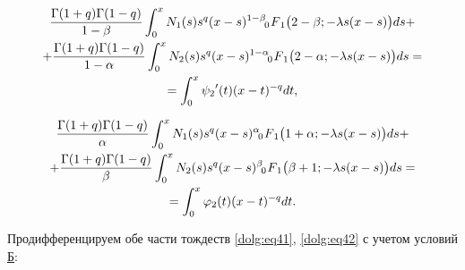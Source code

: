\begin{multline}

\label{dolg:eq41}

\frac{\Gamma(1+q)\Gamma(1-q)}{1-\beta} \int _0^x N_1(s) s^{q} (x-s)^{1-\beta}  \,\,

F_{\hspace{-4mm}0 \hspace{3mm}1} \bigl(2-\beta;-\lambda s (x-s)\bigr) ds +

\\

+\frac{\Gamma(1+q)\Gamma(1-q)}{1-\alpha} \int _0^x N_2(s) s^{q} (x-s)^{1-\alpha}  \,\,

F_{\hspace{-4mm}0 \hspace{3mm}1} \bigl(2-\alpha;-\lambda s (x-s)\bigr) ds =

\\

 = \int _0^x {\psi_2}'(t) (x-t)^{-q} dt,

\end{multline}

\begin{multline}

\label{dolg:eq42}

\frac{\Gamma(1+q)\Gamma(1-q)}{\alpha} \int _0^x N_1(s) s^{q} (x-s)^{\alpha}  \,\,

F_{\hspace{-4mm}0 \hspace{3mm}1} \bigl(1+\alpha;-\lambda s (x-s)\bigr) ds +

\\

+\frac{\Gamma(1+q)\Gamma(1-q)}{\beta} \int _0^x N_2(s) s^{q} (x-s)^{\beta}  \,\,

F_{\hspace{-4mm}0 \hspace{3mm}1} \bigl(\beta+1;-\lambda s (x-s)\bigr) ds =

\\

 = \int _0^x {\varphi_2}(t) (x-t)^{-q} dt.

 \end{multline}



Продифференцируем обе части тождеств \eqref{dolg:eq41}, \eqref{dolg:eq42} с учетом условий \hyperlink{d:uslB}{Б}:


